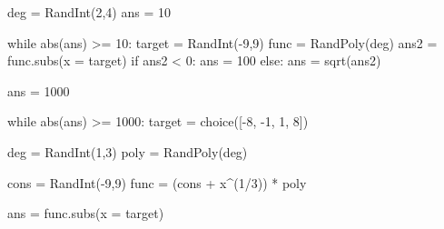 \begin{sagesilent}

deg = RandInt(2,4)
ans = 10

while abs(ans) >= 10:
    target = RandInt(-9,9)
    func = RandPoly(deg)
    ans2 = func.subs(x = target)
    if ans2 < 0:
        ans = 100
    else:
        ans = sqrt(ans2)

\end{sagesilent}


\begin{sagesilent}
ans = 1000

while abs(ans) >= 1000:
    target = choice([-8, -1, 1, 8])

    deg = RandInt(1,3)
    poly = RandPoly(deg)

    cons = RandInt(-9,9)
    func = (cons + x^(1/3)) * poly

    ans = func.subs(x = target)

\end{sagesilent}


